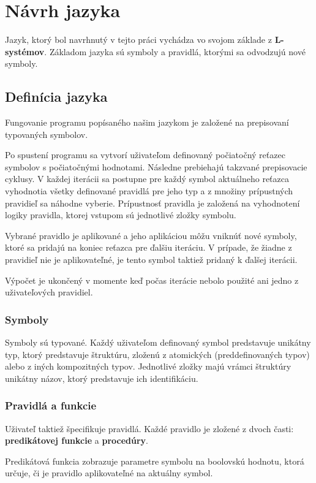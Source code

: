 \chapter{Návrh jazyka}

Jazyk, ktorý bol navrhnutý v tejto práci vychádza vo svojom základe z \textbf{L-systémov}.
Základom jazyka sú symboly a pravidlá, ktorými sa odvodzujú nové symboly.


\section{Definícia jazyka}
Fungovanie programu popísaného našim jazykom je založené na prepisovaní typovaných symbolov.

Po spustení programu sa vytvorí uživateľom definovaný počiatočný reťazec symbolov s počiatočnými hodnotami.
Následne prebiehajú takzvané prepisovacie cyklusy. V každej iterácii sa postupne pre každý symbol aktuálneho reťazca
vyhodnotia všetky definované pravidlá pre jeho typ a z množiny prípustných pravidieľ sa náhodne vyberie. Prípustnosť pravidla je založená na vyhodnotení logiky pravidla, ktorej vstupom sú jednotlivé zložky symbolu.

Vybrané pravidlo je aplikované a jeho aplikáciou môžu vniknúť nové symboly, ktoré sa pridajú na koniec reťazca pre ďalšiu iteráciu.
V prípade, že žiadne z pravidieľ nie je aplikovateľné, je tento symbol taktiež pridaný k ďalšej iterácii.

Výpočet je ukončený v momente keď počas iterácie nebolo použité ani jedno z uživateľových pravidiel.

\subsection{Symboly}
Symboly sú typované. Každý uživateľom definovaný symbol predstavuje unikátny typ, ktorý predstavuje štruktúru, zloženú z atomických (preddefinovaných typov) alebo
z iných kompozitných typov. Jednotlivé zložky majú vrámci štruktúry unikátny názov, ktorý predstavuje ich identifikáciu.

\subsection{Pravidlá a funkcie}
Uživateľ taktiež špecifikuje pravidlá. Každé pravidlo je zložené z dvoch časti: \textbf{predikátovej funkcie} a \textbf{procedúry}.

Predikátová funkcia zobrazuje parametre symbolu na boolovskú hodnotu, ktorá určuje, či je pravidlo aplikovateľné na
aktuálny symbol. 


